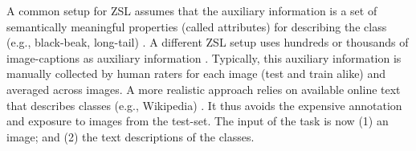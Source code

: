 \documentclass[11pt,a4paper]{article}
\newcommand\gal[1]{\textcolor{bright}{\textbf{GAL:} #1 }}
\newcommand\tzuf[1]{\textcolor{blue}{\textbf{TZUF:} #1 }}
\begin{document}
\vspace{-0.13in}



A common setup for ZSL assumes that the auxiliary information is a set of semantically meaningful properties (called attributes) for describing the class (e.g., black-beak, long-tail) \citep{wah2011caltech,farhadi2009describing}. A different ZSL setup  uses hundreds or thousands of image-captions as auxiliary information \citep{reed2016learning,Felix_2018_ECCV}. Typically, this auxiliary information is  manually collected by human raters for each image (test and train alike) and averaged across images.
A more realistic approach 
relies on available online text that describes classes (e.g., Wikipedia) \cite{elhoseiny2017link}. It thus avoids the expensive annotation and exposure to images from the test-set. The input of the task is now (1) an image; and (2) the text descriptions of the classes. 

\end{document}
